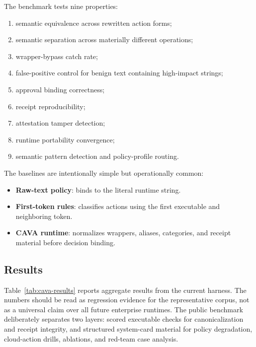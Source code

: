 \documentclass[11pt]{article}
\begin{document}
The benchmark tests nine properties:
\begin{enumerate}
  \item semantic equivalence across rewritten action forms;
  \item semantic separation across materially different operations;
  \item wrapper-bypass catch rate;
  \item false-positive control for benign text containing high-impact strings;
  \item approval binding correctness;
  \item receipt reproducibility;
  \item attestation tamper detection;
  \item runtime portability convergence;
  \item semantic pattern detection and policy-profile routing.
\end{enumerate}

The baselines are intentionally simple but operationally common:
\begin{itemize}
  \item \textbf{Raw-text policy}: binds to the literal runtime string.
  \item \textbf{First-token rules}: classifies actions using the first executable and neighboring token.
  \item \textbf{CAVA runtime}: normalizes wrappers, aliases, categories, and receipt material before decision binding.
\end{itemize}

\subsection{Results}

Table~\ref{tab:cava-results} reports aggregate results from the current harness. The numbers should be read as regression evidence for the representative corpus, not as a universal claim over all future enterprise runtimes. The public benchmark deliberately separates two layers: scored executable checks for canonicalization and receipt integrity, and structured system-card material for policy degradation, cloud-action drills, ablations, and red-team case analysis.
\end{document}
